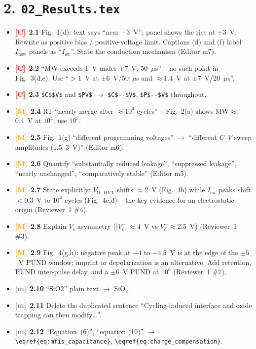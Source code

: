 \documentclass[10pt,a4paper]{article}
\newcommand{\C}{\textcolor{red}{\textbf{[C]}}}
\newcommand{\M}{\textcolor{orange}{\textbf{[M]}}}
\newcommand{\m}{\textcolor{gray}{\textbf{[m]}}}
\begin{document}
\section*{2. \texttt{02\_Results.tex}}
\begin{itemize}
\item \C\ \textbf{2.1} Fig.~1(d): text says ``near $-3$~V''; panel shows the rise at $+3$~V. Rewrite as positive bias / positive-voltage limit. Captions (d) and (f) label $I_{\mathrm{nsw}}$ panels as ``$I_{\mathrm{sw}}$''. State the conduction mechanism (Editor m7).
\item \C\ \textbf{2.2} ``MW exceeds 1~V under $\pm7$~V, 50~$\mu$s'' -- no such point in Fig.~3(d,e). Use ``$>$1~V at $\pm6$~V/50~$\mu$s and $\approx$1.4~V at $\pm7$~V/20~$\mu$s''.
\item \C\ \textbf{2.3} \verb|$C$$V$| and \verb|$PV$| $\rightarrow$ \verb|$C$--$V$|, \verb|$P$--$V$| throughout.
\item \M\ \textbf{2.4} RT ``nearly merge after $\approx10^{4}$ cycles'' -- Fig.~2(a) shows MW$\approx$0.4~V at $10^{4}$; use $10^{5}$.
\item \M\ \textbf{2.5} Fig.~1(g) ``different programming voltages'' $\rightarrow$ ``different $C$--$V$ sweep amplitudes (1.5--3~V)'' (Editor m6).
\item \M\ \textbf{2.6} Quantify ``substantially reduced leakage'', ``suppressed leakage'', ``nearly unchanged'', ``comparatively stable'' (Editor m5).
\item \M\ \textbf{2.7} State explicitly: $V_{\mathrm{th,HVT}}$ shifts $\approx$2~V (Fig.~4b) while $I_{\mathrm{sw}}$ peaks shift $<$0.3~V to $10^{4}$ cycles (Fig.~4c,d) -- the key evidence for an electrostatic origin (Reviewer~1 \#4).
\item \M\ \textbf{2.8} Explain $V_c$ asymmetry ($|V_c^-|\approx4$~V vs $V_c^+\approx2.5$~V) (Reviewer~1 \#3).
\item \M\ \textbf{2.9} Fig.~4(g,h): negative peak at $-4$ to $-4.5$~V is at the edge of the $\pm5$~V PUND window; imprint or depolarization is an alternative. Add retention, PUND inter-pulse delay, and a $\pm6$~V PUND at $10^{6}$ (Reviewer~1 \#7).
\item \m\ \textbf{2.10} ``SiO2'' plain text $\rightarrow$ SiO$_2$.
\item \m\ \textbf{2.11} Delete the duplicated sentence ``Cycling-induced interface and oxide trapping can then modify\ldots''.
\item \m\ \textbf{2.12} ``Equation~(6)'', ``equation (10)'' $\rightarrow$ \verb|\eqref{eq:mfis_capacitance}|, \verb|\eqref{eq:charge_compensation}|.

\end{itemize}
\end{document}
